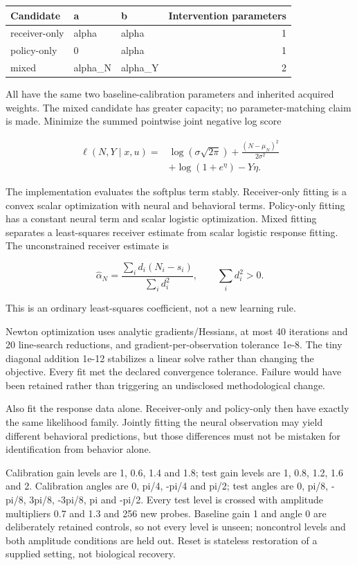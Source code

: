 \documentclass[
  american,
  11pt,
  letterpaper,
]{article}
\newcounter{none} %
\begin{document}
{\def\LTcaptype{none} %
\begin{longtable}[]{@{}lllr@{}}
\toprule\noalign{}
Candidate & a & b & Intervention parameters \\
\midrule\noalign{}
\endhead
\bottomrule\noalign{}
\endlastfoot
receiver-only & alpha & alpha & 1 \\
policy-only & 0 & alpha & 1 \\
mixed & alpha\_N & alpha\_Y & 2 \\
\end{longtable}
}

All have the same two baseline-calibration parameters and inherited acquired weights. The mixed candidate has greater capacity; no parameter-matching claim is made. Minimize the summed pointwise joint negative log score

\[
\begin{aligned}
\ell(N,Y\mid x,u)=&\log(\sigma\sqrt{2\pi})
 +\frac{(N-\mu_N)^2}{2\sigma^2}\\
 &+\log(1+e^\eta)-Y\eta.
\end{aligned}\tag{E3}
\]

The implementation evaluates the softplus term stably. Receiver-only fitting is a convex scalar optimization with neural and behavioral terms. Policy-only fitting has a constant neural term and scalar logistic optimization. Mixed fitting separates a least-squares receiver estimate from scalar logistic response fitting. The unconstrained receiver estimate is

\[
\widehat\alpha_N=\frac{\sum_i d_i(N_i-s_i)}{\sum_i d_i^2},
\qquad \sum_i d_i^2>0.\tag{E4}
\]

This is an ordinary least-squares coefficient, not a new learning rule.

Newton optimization uses analytic gradients/Hessians, at most 40 iterations and 20 line-search reductions, and gradient-per-observation tolerance 1e-8. The tiny diagonal addition 1e-12 stabilizes a linear solve rather than changing the objective. Every fit met the declared convergence tolerance. Failure would have been retained rather than triggering an undisclosed methodological change.

Also fit the response data alone. Receiver-only and policy-only then have exactly the same likelihood family. Jointly fitting the neural observation may yield different behavioral predictions, but those differences must not be mistaken for identification from behavior alone.

Calibration gain levels are 1, 0.6, 1.4 and 1.8; test gain levels are 1, 0.8, 1.2, 1.6 and 2. Calibration angles are 0, pi/4, -pi/4 and pi/2; test angles are 0, pi/8, -pi/8, 3pi/8, -3pi/8, pi and -pi/2. Every test level is crossed with amplitude multipliers 0.7 and 1.3 and 256 new probes. Baseline gain 1 and angle 0 are deliberately retained controls, so not every level is unseen; noncontrol levels and both amplitude conditions are held out. Reset is stateless restoration of a supplied setting, not biological recovery.
\end{document}
